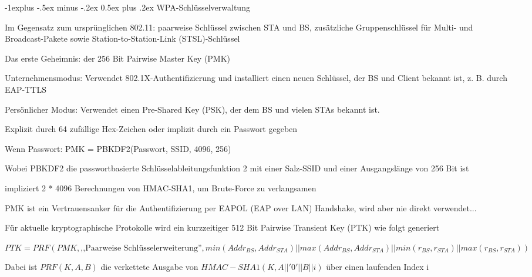 \documentclass[a4paper]{article}
\makeatletter
\renewcommand{\subsection}{\@startsection{subsection}{2}{0mm}%
 {-1explus -.5ex minus -.2ex}%
 {0.5ex plus .2ex}%
 {\normalfont\normalsize\bfseries}}
\makeatother
\begin{document}
\begin{multicols}{3}
      \subsection{WPA-Schlüsselverwaltung}
      \begin{itemize*}
            \item Im Gegensatz zum ursprünglichen 802.11: paarweise Schlüssel zwischen STA und BS, zusätzliche Gruppenschlüssel für Multi- und Broadcast-Pakete sowie Station-to-Station-Link (STSL)-Schlüssel
            \item Das erste Geheimnis: der 256 Bit Pairwise Master Key (PMK)
            \begin{itemize*}
                  \item Unternehmensmodus: Verwendet 802.1X-Authentifizierung und installiert einen neuen Schlüssel, der BS und Client bekannt ist, z. B. durch EAP-TTLS
                  \item Persönlicher Modus: Verwendet einen Pre-Shared Key (PSK), der dem BS und vielen STAs bekannt ist.
                  \begin{itemize*}
                        \item Explizit durch 64 zufällige Hex-Zeichen oder implizit durch ein Passwort gegeben
                        \item Wenn Passwort: PMK = PBKDF2(Passwort, SSID, 4096, 256)
                        \item Wobei PBKDF2 die passwortbasierte Schlüsselableitungsfunktion 2 mit einer Salz-SSID und einer Ausgangslänge von 256 Bit ist
                        \item impliziert 2 * 4096 Berechnungen von HMAC-SHA1, um Brute-Force zu verlangsamen
                  \end{itemize*}
            \end{itemize*}
            \item PMK ist ein Vertrauensanker für die Authentifizierung per EAPOL (EAP over LAN) Handshake, wird aber nie direkt verwendet...
            \item Für aktuelle kryptographische Protokolle wird ein kurzzeitiger 512 Bit Pairwise Transient Key (PTK) wie folgt generiert
            \begin{itemize*}
                  \item $PTK = PRF(PMK, \text{,,Paarweise Schlüsselerweiterung''}, min(Addr_{BS}, Addr_{STA}) || max(Addr_{BS}, Addr_{STA}) || min(r_{BS}, r_{STA}) || max(r_{BS}, r_{STA}))$
                  \item Dabei ist $PRF(K, A, B)$ die verkettete Ausgabe von $HMAC-SHA1(K, A || '0' || B || i)$ über einen laufenden Index i

\end{itemize*}
\end{itemize*}
\end{multicols}
\end{document}
